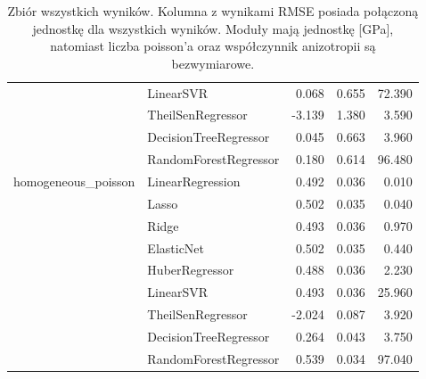 \begin{table}[]
{\begin{tabular}{llrrr}
     & LinearSVR & 0.068 & 0.655 & 72.390 \\
     & TheilSenRegressor & -3.139 & 1.380 & 3.590 \\
     & DecisionTreeRegressor & 0.045 & 0.663 & 3.960 \\
     & RandomForestRegressor & 0.180 & 0.614 & 96.480 \\
    \cline{1-5}
    \multirow[t]{9}{*}{homogeneous\_poisson} & LinearRegression & 0.492 & 0.036 & 0.010 \\
     & Lasso & 0.502 & 0.035 & 0.040 \\
     & Ridge & 0.493 & 0.036 & 0.970 \\
     & ElasticNet & 0.502 & 0.035 & 0.440 \\
     & HuberRegressor & 0.488 & 0.036 & 2.230 \\
     & LinearSVR & 0.493 & 0.036 & 25.960 \\
     & TheilSenRegressor & -2.024 & 0.087 & 3.920 \\
     & DecisionTreeRegressor & 0.264 & 0.043 & 3.750 \\
     & RandomForestRegressor & 0.539 & 0.034 & 97.040 \\
    \cline{1-5}
    \bottomrule
    \end{tabular}
    
    
}

 \caption{Zbiór wszystkich wyników. Kolumna z wynikami RMSE posiada połączoną jednostkę dla wszystkich wyników. Moduły mają jednostkę [GPa], natomiast liczba poisson'a oraz współczynnik anizotropii są bezwymiarowe.}
    
\end{table}